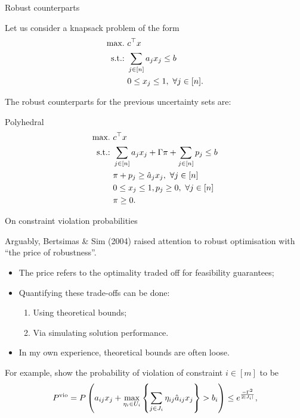 \begin{frame}{Robust counterparts}

	Let us consider a knapsack problem of the form
	\begin{equation*}
	\begin{aligned}
		\mathop{\text{max.} \ } & c^\top x \\		
		\text{s.t.:~} & \sum_{j \in [n]} a_j x_j \le b \\
		& 0 \le x_j \le 1, \ \forall j \in [n].
	\end{aligned}
	\end{equation*}
	
	The \alert{robust counterparts} for the previous uncertainty sets are:
	
	\begin{block}{Polyhedral} 
		\vspace{-18pt}
		\begin{equation*}
		\begin{aligned}
			\mathop{\text{max.} \ } & c^\top x \\		
			\text{s.t.:~} & \sum_{j \in [n]} a_j x_j + \Gamma \pi + \sum_{j \in [n]} p_j \le b \\
			& \pi + p_j \ge \hat{a}_j x_j, \ \forall j \in [n] \\
			& 0 \le x_j \le 1, p_j \ge 0, \ \forall j \in [n] \\
			& \pi \ge 0.
		\end{aligned}
		\end{equation*}
	\end{block}
	
\end{frame}


\begin{frame}{On constraint violation probabilities}

	Arguably, \alert{Bertsimas \& Sim (2004)} raised attention to robust optimisation with ``the price of robustness''.
	\vspace{-6pt}
	\begin{itemize}
		\item The \alert{price} refers to the optimality traded off for feasibility guarantees;
		\item Quantifying these trade-offs can be done:
		\begin{enumerate}
			\item Using \alert{theoretical} bounds;
			\item Via \alert{simulating} solution performance.	
		\end{enumerate}
		\item In my own experience, theoretical bounds are often loose. 	
	\end{itemize}
	
	\pause
	For example, {\small \cite{bertsimas2004price}} show the probability of violation of constraint $i \in [m]$ to be
	\begin{equation*}
		P^{\text{vio}} = P\left(a_{ij}x_j + \max_{\eta_i \in U_i} \left\{ \sum_{j \in J_i}\eta_{ij}\hat{a}_{ij}x_j \right \} > b_i\right) \le e^{\frac{-\Gamma^2}{2|J_i|}},
	\end{equation*}	
	
\end{frame}



